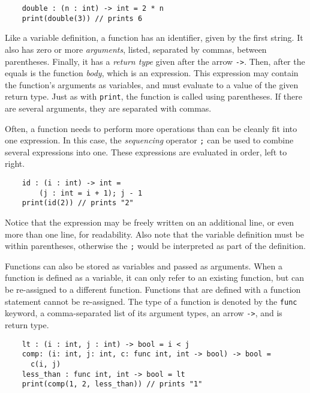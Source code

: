 \documentclass[main.tex]{subfiles}
\begin{document}
	\begin{lstlisting}
	double : (n : int) -> int = 2 * n
	print(double(3)) // prints 6 \end{lstlisting}
	
	Like a variable definition, a function has an identifier, given by the first string. It also has zero or more \textit{arguments}, listed, separated by commas, between parentheses. Finally, it has a \textit{return type} given after the arrow \texttt{->}. Then, after the equals is the function \textit{body}, which is an expression. This expression may contain the function's arguments as variables, and must evaluate to a value of the given return type. Just as with \texttt{print}, the function is called using parentheses. If there are several arguments, they are separated with commas. \newline
	
	Often, a function needs to perform more operations than can be cleanly fit into one expression. In this case, the \textit{sequencing} operator \texttt{;} can be used to combine several expressions into one. These expressions are evaluated in order, left to right.
	
	\begin{lstlisting}
	id : (i : int) -> int = 
	    (j : int = i + 1); j - 1
	print(id(2)) // prints "2" \end{lstlisting}
	
	Notice that the expression may be freely written on an additional line, or even more than one line, for readability. Also note that the variable definition must be within parentheses, otherwise the \texttt{;} would be interpreted as part of the definition. \newline
	
	Functions can also be stored as variables and passed as arguments. When a function is defined as a variable, it can only refer to an existing function, but can be re-assigned to a different function. Functions that are defined with a function statement cannot be re-assigned. The type of a function is denoted by the \texttt{func} keyword, a comma-separated list of its argument types, an arrow \texttt{->}, and is return type.
	
	\begin{lstlisting}
	lt : (i : int, j : int) -> bool = i < j
	comp: (i: int, j: int, c: func int, int -> bool) -> bool = 
	  c(i, j)
	less_than : func int, int -> bool = lt
	print(comp(1, 2, less_than)) // prints "1" \end{lstlisting}
	
\end{document}
